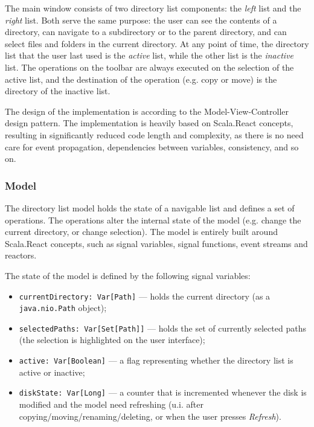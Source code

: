The main window consists of two directory list components: the \emph{left} list and the \emph{right} list. Both serve the same purpose: the user can see the contents of a directory, can navigate to a subdirectory or to the parent directory, and can select files and folders in the current directory. At any point of time, the directory list that the user last used is the \emph{active} list, while the other list is the \emph{inactive} list. The operations on the toolbar are always executed on the selection of the active list, and the destination of the operation (e.g. copy or move) is the directory of the inactive list.

The design of the implementation is according to the Model-View-Controller design pattern. The implementation is heavily based on Scala.React concepts, resulting in significantly reduced code length and complexity, as there is no need care for event propagation, dependencies between variables, consistency, and so on.


\subsubsection{Model}

The directory list model holds the state of a navigable list and defines a set of operations. The operations alter the internal state of the model (e.g. change the current directory, or change selection). The model is entirely built around Scala.React concepts, such as signal variables, signal functions, event streams and reactors.

The state of the model is defined by the following signal variables:
\begin{itemize}
\item \texttt{currentDirectory: Var[Path]} --- holds the current directory (as a \texttt{java.nio.Path} object);
\item \texttt{selectedPaths: Var[Set[Path]]} --- holds the set of currently selected paths (the selection is highlighted on the user interface);
\item \texttt{active: Var[Boolean]} --- a flag representing whether the directory list is active or inactive;
\item \texttt{diskState: Var[Long]} --- a counter that is incremented whenever the disk is modified and the model need refreshing (u.i. after copying/moving/renaming/deleting, or when the user presses \emph{Refresh}).
\end{itemize}

